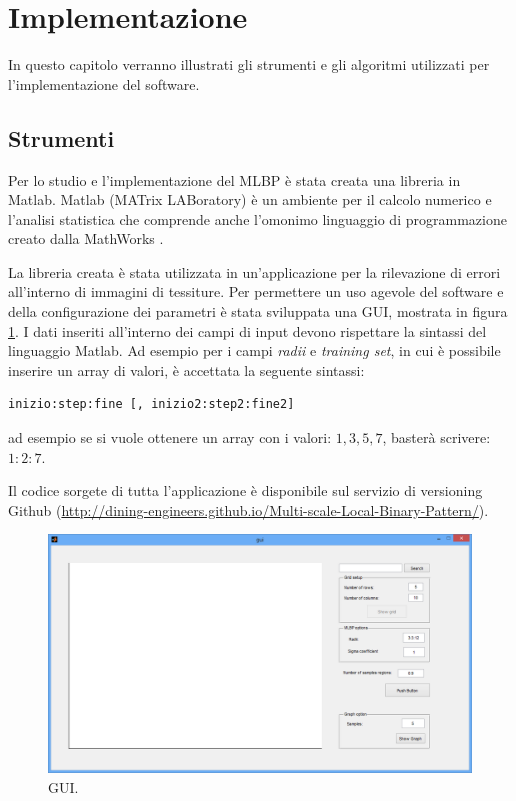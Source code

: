 \section{Implementazione}
In questo capitolo verranno illustrati gli strumenti e gli algoritmi utilizzati per l'implementazione del software.

\subsection{Strumenti}
Per lo studio e l'implementazione del \acf{MLBP} è stata creata una libreria in Matlab. 
Matlab (MATrix LABoratory) è un ambiente per il calcolo numerico e l'analisi statistica che comprende anche l'omonimo linguaggio di programmazione creato dalla MathWorks \cite{MATLAB:2013}.

La libreria creata è stata utilizzata in un'applicazione per la rilevazione di errori all'interno di immagini di tessiture.
Per permettere un uso agevole del software e della configurazione dei parametri è stata sviluppata una \acf{GUI}, mostrata in figura \ref{fig:GUI}.
I dati inseriti all'interno dei campi di input devono rispettare la sintassi del linguaggio Matlab. Ad esempio per i campi \textit{radii} e \textit{training set}, in cui è possibile inserire un array di valori, è accettata la seguente sintassi:

\begin{lstlisting}
inizio:step:fine [, inizio2:step2:fine2]
\end{lstlisting}

ad esempio se si vuole ottenere un array con i valori: $1, 3, 5, 7 $, basterà scrivere: $1:2:7$.

Il codice sorgete di tutta l'applicazione è disponibile sul servizio di versioning Github (\href{http://dining-engineers.github.io/Multi-scale-Local-Binary-Pattern/}{http://dining-engineers.github.io/Multi-scale-Local-Binary-Pattern/}).\\

\begin{figure}[ht]
\begin{center}
\includegraphics[width=.95\textwidth]{img/gui}
\caption{GUI.}
\label{fig:GUI}
\end{center}
\end{figure}

